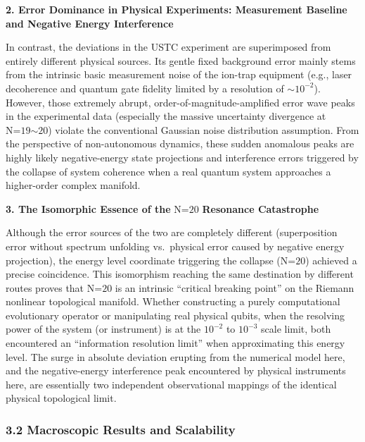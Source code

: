 \textbf{2. Error Dominance in Physical Experiments: Measurement Baseline
and Negative Energy Interference}

In contrast, the deviations in the USTC experiment are superimposed from
entirely different physical sources. Its gentle fixed background error
mainly stems from the intrinsic basic measurement noise of the ion-trap
equipment (e.g., laser decoherence and quantum gate fidelity limited by
a resolution of \(\text{∼}\text{10}^{\text{−2}}\)). However, those
extremely abrupt, order-of-magnitude-amplified error wave peaks in the
experimental data (especially the massive uncertainty divergence at
\(\text{N}\text{=19∼20}\)) violate the conventional Gaussian noise
distribution assumption. From the perspective of non-autonomous
dynamics, these sudden anomalous peaks are highly likely negative-energy
state projections and interference errors triggered by the collapse of
system coherence when a real quantum system approaches a higher-order
complex manifold.

\textbf{3. The Isomorphic Essence of the} \(\text{N}\text{=20}\)
\textbf{Resonance Catastrophe}

Although the error sources of the two are completely different
(superposition error without spectrum unfolding vs.~physical error
caused by negative energy projection), the energy level coordinate
triggering the collapse (\(\text{N}\text{=20}\)) achieved a precise
coincidence. This isomorphism reaching the same destination by different
routes proves that \(\text{N}\text{=20}\) is an intrinsic ``critical
breaking point'' on the Riemann nonlinear topological manifold. Whether
constructing a purely computational evolutionary operator or
manipulating real physical qubits, when the resolving power of the
system (or instrument) is at the \(\text{10}^{\text{−2}}\) to
\(\text{10}^{\text{−3}}\) scale limit, both encountered an ``information
resolution limit'' when approximating this energy level. The surge in
absolute deviation erupting from the numerical model here, and the
negative-energy interference peak encountered by physical instruments
here, are essentially two independent observational mappings of the
identical physical topological limit.

\hypertarget{macroscopic-results-and-scalability}{%
\subsubsection{\texorpdfstring{\textbf{3.2 Macroscopic Results and
Scalability}}{3.2 Macroscopic Results and Scalability}}\label{macroscopic-results-and-scalability}}

